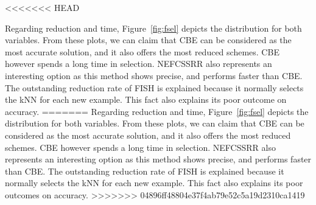\documentclass[preprint,12pt]{elsarticle}
\begin{document}
\begin{itemize}
\begin{table}[!htp]
\renewcommand{\arraystretch}{1.3}
\centering
\scriptsize
\caption{Wilcoxon test results and average rankings of methods (Friedman Procedure \& Adjusted p-value with Holm's Test) for accuracy}
\label{tab:wilcoxon-isel}
\end{table}

<<<<<<< HEAD



Regarding reduction and time, Figure~\ref{fig:fsel} depicts the distribution for both variables. From these plots, we can claim that CBE can be considered as the most accurate solution, and it also offers the most reduced schemes. CBE however spends a long time in selection. NEFCSSRR also represents an interesting option as this method shows precise, and performs faster than CBE. The outstanding reduction rate of FISH is explained because it normally selects the kNN for each new example. This fact also explains its poor outcome on accuracy.
=======
Regarding reduction and time, Figure~\ref{fig:fsel} depicts the distribution for both variables. From these plots, we can claim that CBE can be considered as the most accurate solution, and it also offers the most reduced schemes. CBE however spends a long time in selection. NEFCSSRR also represents an interesting option as this method shows precise, and performs faster than CBE. The outstanding reduction rate of FISH is explained because it normally selects the kNN for each new example. This fact also explains its poor outcomes on accuracy.
>>>>>>> 04896ff48804e37f4ab79e52c5a19d2310ca1419


\end{itemize}
\end{document}
